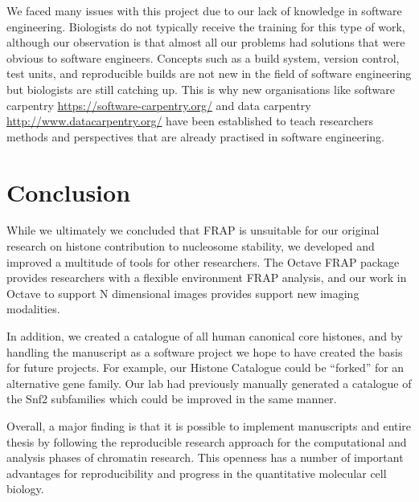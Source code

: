 We faced many issues with this project due to our lack of knowledge in
software engineering.  Biologists do not typically receive the training for this
type of work, although our observation is that almost all our
problems had solutions that were obvious to software engineers.
Concepts such as a build system, version control, test units,
and reproducible builds are not new in the field of software engineering but
biologists are still catching up.  This is why new
organisations like software
carpentry \url{https://software-carpentry.org/} and data
carpentry \url{http://www.datacarpentry.org/} have been established to
teach researchers
methods and perspectives that are already practised in software engineering.

\section{Conclusion}

While we ultimately we concluded that FRAP
is unsuitable for our original research on histone contribution to
nucleosome stability,
we developed
and improved a multitude of tools for other researchers.  The Octave
FRAP package provides researchers with a flexible environment FRAP
analysis, and our work in Octave to support N dimensional images
provides support new imaging modalities.

In addition, we created a catalogue of all human canonical core
histones, and by handling the manuscript as a software project we hope
to have created the basis for future projects.  For example, our
Histone Catalogue could be ``forked'' for an alternative gene family.
Our lab had previously manually generated a catalogue of the Snf2
subfamilies \citep{andrew-snf2-catalogue} which could be improved in
the same manner.

Overall, a major finding is that it is possible to implement
manuscripts and entire thesis by following the reproducible research
approach for the computational and analysis phases of chromatin
research.  This openness has a number of important advantages for
reproducibility and progress in the quantitative molecular cell biology.
